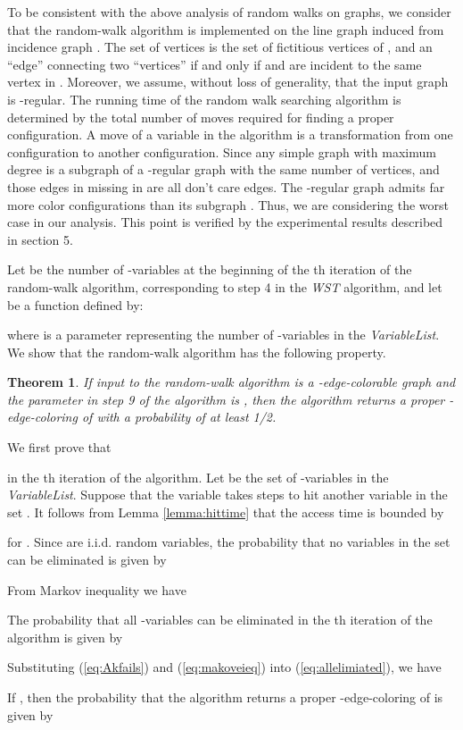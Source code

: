 \documentclass[11pt]{article}
\newtheorem{theorem}{Theorem}[section]
\newenvironment{proof}[1][Proof]{\begin{trivlist}
\item[\hskip \labelsep {\bfseries #1}]}{\end{trivlist}}
\begin{document}
To be consistent with the above analysis of random walks on graphs, we consider that the random-walk algorithm is implemented on the line graph  induced from incidence graph . The set of vertices   is the set of fictitious vertices of , and an ``edge'' connecting two ``vertices''  if and only if  and   are incident to the same vertex in . Moreover, we assume, without loss of generality, that the input graph is -regular. The running time of the random walk searching algorithm is determined by the total number of moves required for finding a proper configuration. A move of a variable in the algorithm is a transformation from one configuration to another configuration. Since any simple graph  with maximum degree  is a subgraph of a -regular graph  with the same number of vertices, and those edges in  missing in  are all don't care edges. The -regular graph  admits far more color configurations than its subgraph . Thus, we are considering the worst case in our analysis. This point is verified by the experimental results described in section 5. 

Let  be the number of -variables at the beginning of the th iteration of the random-walk algorithm, corresponding to step 4 in the {\it WST} algorithm, and let  be a function defined by:

where   is a parameter representing the number of -variables in the {\it VariableList}. We show that the random-walk algorithm has the following property.

\begin{theorem} 
If input to the random-walk algorithm is a -edge-colorable graph  and the parameter in step 9 of the algorithm is , then the algorithm returns a proper -edge-coloring of  with a probability of at least 1/2. 
\end{theorem}
\begin{proof}
We first prove that 

in the th iteration of the algorithm. Let  be the set of  -variables in the {\it VariableList}. Suppose that the variable  takes  steps to hit another variable in the set . It follows from Lemma \ref{lemma:hittime} that the access time is bounded by

for . Since  are i.i.d. random variables, the probability that no variables in the set  can be eliminated is given by
 
From Markov inequality we have

The probability that all -variables can be eliminated in the th iteration of the algorithm is given by

Substituting (\ref{eq:Akfails}) and (\ref{eq:makoveieq}) into (\ref{eq:allelimiated}), we have

If , then the probability that the algorithm returns a proper -edge-coloring of  is given by

\end{proof}
\end{document}
